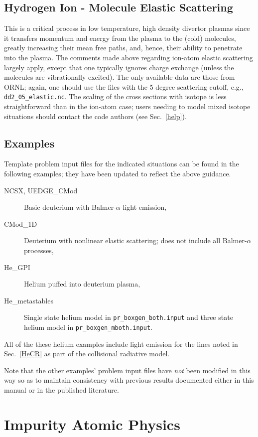 \documentclass[12pt]{report}
\begin{document}
\subsection{Hydrogen Ion - Molecule Elastic Scattering}

This is a critical process in low temperature, high density
divertor plasmas since it transfers momentum and energy
from the plasma to the (cold) molecules, greatly increasing their
mean free paths, and, hence, their ability to penetrate
into the plasma.  The comments made above regarding ion-atom
elastic scattering largely apply, except that one 
typically ignores charge exchange (unless the molecules are
vibrationally excited).  The only available data are those
from ORNL\cite{Krst98}; again, one should use the files with
the 5 degree scattering cutoff, e.g., {\tt dd2\_05\_elastic.nc}.
The scaling of the cross sections with isotope is less
straightforward than in the ion-atom case; users needing
to model mixed isotope situations should contact
the code authors (see Sec.~\ref{help}).

\subsection{Examples}

Template problem input files for
the indicated situations can be found in the following
examples; they have been updated to reflect the above
guidance.
\begin{description}
  \item[NCSX, UEDGE\_CMod] Basic deuterium with Balmer-$\alpha$ light emission, 
  \item[CMod\_1D] Deuterium with nonlinear elastic scattering; does
not include all Balmer-$\alpha$ processes, 
  \item[He\_GPI] Helium puffed into deuterium plasma, 
  \item[He\_metastables] Single state helium model
in {\tt pr\_boxgen\_both.input} and three state helium model
in {\tt pr\_boxgen\_mboth.input}.
\end{description}
All of the these helium examples include light emission for 
the lines noted in Sec.~\ref{HeCR} as part of the collisional
radiative model.

Note that the other examples' problem input
files have {\em not} been modified in this way
so as to
maintain consistency with previous results documented either in this manual
or in the published literature.

\section{Impurity Atomic Physics}
\end{document}
